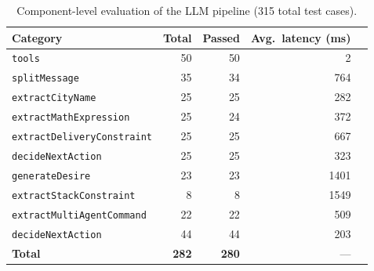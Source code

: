 \begin{table}[H]
  \centering
  \caption{Component-level evaluation of the LLM pipeline (315 total test cases).}
  \label{tab:llm_pipeline_eval}
  \begin{tabular}{lrrrr}
    \toprule
    \textbf{Category} & \textbf{Total} & \textbf{Passed} & \textbf{Avg.\ latency (ms)} \\
    \midrule
    \texttt{tools}                    & 50 & 50 &   2 \\
    \texttt{splitMessage}             & 35 & 34 & 764 \\
    \texttt{extractCityName}          & 25 & 25 & 282 \\
    \texttt{extractMathExpression}    & 25 & 24 & 372 \\
    \texttt{extractDeliveryConstraint}& 25 & 25 & 667 \\
    \texttt{decideNextAction}         & 25 & 25 & 323 \\
    \texttt{generateDesire}             & 23 & 23 & 1401 \\
    \texttt{extractStackConstraint}     &  8 &  8 & 1549 \\
    \texttt{extractMultiAgentCommand}   & 22 & 22 &  509 \\
    \texttt{decideNextAction}           & 44 & 44 &  203 \\
    \midrule
    \textbf{Total}                      & \textbf{282} & \textbf{280} & --- \\
    \bottomrule
  \end{tabular}
\end{table}